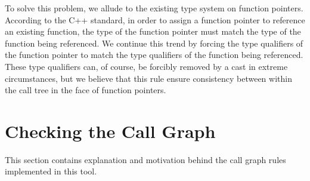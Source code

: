 To solve this problem, we allude to the existing type system on function pointers.  According to the C++ standard, in order to assign a function pointer to reference an existing function, the type of the function pointer must match the type of the function being referenced.  We continue this trend by forcing the type qualifiers of the function pointer to match the type qualifiers of the function being referenced.  These type qualifiers can, of course, be forcibly removed by a cast in extreme circumstances, but we believe that this rule ensure consistency between within the call tree in the face of function pointers.

\section{Checking the Call Graph}

This section contains explanation and motivation behind the call graph rules implemented in this tool.

